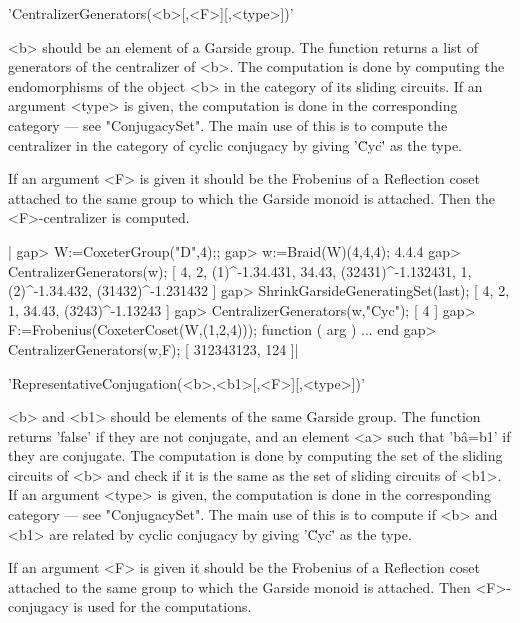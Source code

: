 

'CentralizerGenerators(<b>[,<F>][,<type>])'

<b> should be an element of a Garside group. The function returns a list of
generators  of the centralizer of <b>. The computation is done by computing
the  endomorphisms  of  the  object  <b>  in  the  category  of its sliding
circuits.  If an argument <type>  is given, the computation  is done in the
corresponding  category --- see "ConjugacySet". The  main use of this is to
compute  the  centralizer  in  the  category  of cyclic conjugacy by giving
'\"Cyc\"' as the type.

If  an argument  <F> is  given it  should be  the Frobenius of a Reflection
coset  attached to the same group to  which the Garside monoid is attached.
Then the <F>-centralizer is computed.

|    gap> W:=CoxeterGroup("D",4);;
    gap> w:=Braid(W)(4,4,4);
    4.4.4
    gap> CentralizerGenerators(w);
    [ 4, 2, (1)^-1.34.431, 34.43, (32431)^-1.132431, 1, (2)^-1.34.432,
      (31432)^-1.231432 ]
    gap> ShrinkGarsideGeneratingSet(last);
    [ 4, 2, 1, 34.43, (3243)^-1.13243 ]
    gap> CentralizerGenerators(w,"Cyc");
    [ 4 ]
    gap> F:=Frobenius(CoxeterCoset(W,(1,2,4)));
    function ( arg ) ... end
    gap> CentralizerGenerators(w,F);
    [ 312343123, 124 ]|



'RepresentativeConjugation(<b>,<b1>[,<F>][,<type>])'

<b>  and <b1> should  be elements of  the same Garside  group. The function
returns  'false' if they  are not conjugate,  and an element  <a> such that
'b\^a=b1'  if they are conjugate. The  computation is done by computing the
set  of the sliding circuits of <b> and check  if it is the same as the set
of  sliding  circuits  of  <b1>.  If  an  argument  <type>  is  given,  the
computation  is done in the  corresponding category --- see "ConjugacySet".
The  main use of this is  to compute if <b> and  <b1> are related by cyclic
conjugacy by giving '\"Cyc\"' as the type.

If  an argument  <F> is  given it  should be  the Frobenius of a Reflection
coset  attached to the same group to  which the Garside monoid is attached.
Then <F>-conjugacy is used for the computations.

